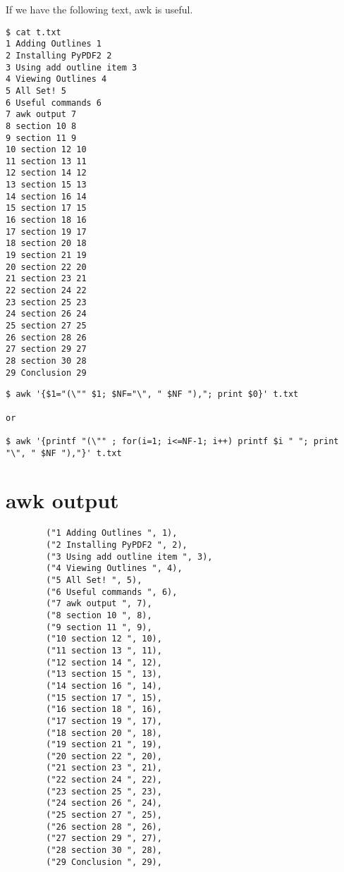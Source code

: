 \documentclass{article}
\begin{document}
If we have the following text, awk is useful.

\begin{verbatim}
$ cat t.txt
1 Adding Outlines 1
2 Installing PyPDF2 2
3 Using add outline item 3
4 Viewing Outlines 4
5 All Set! 5
6 Useful commands 6
7 awk output 7
8 section 10 8
9 section 11 9
10 section 12 10
11 section 13 11
12 section 14 12
13 section 15 13
14 section 16 14
15 section 17 15
16 section 18 16
17 section 19 17
18 section 20 18
19 section 21 19
20 section 22 20
21 section 23 21
22 section 24 22
23 section 25 23
24 section 26 24
25 section 27 25
26 section 28 26
27 section 29 27
28 section 30 28
29 Conclusion 29

\end{verbatim}


\begin{verbatim}
$ awk '{$1="(\"" $1; $NF="\", " $NF "),"; print $0}' t.txt

or 

$ awk '{printf "(\"" ; for(i=1; i<=NF-1; i++) printf $i " "; print "\", " $NF "),"}' t.txt
\end{verbatim}





\newpage

\section{awk output}

\begin{verbatim}
        ("1 Adding Outlines ", 1),
        ("2 Installing PyPDF2 ", 2),
        ("3 Using add outline item ", 3),
        ("4 Viewing Outlines ", 4),
        ("5 All Set! ", 5),
        ("6 Useful commands ", 6),
        ("7 awk output ", 7),
        ("8 section 10 ", 8),
        ("9 section 11 ", 9),
        ("10 section 12 ", 10),
        ("11 section 13 ", 11),
        ("12 section 14 ", 12),
        ("13 section 15 ", 13),
        ("14 section 16 ", 14),
        ("15 section 17 ", 15),
        ("16 section 18 ", 16),
        ("17 section 19 ", 17),
        ("18 section 20 ", 18),
        ("19 section 21 ", 19),
        ("20 section 22 ", 20),
        ("21 section 23 ", 21),
        ("22 section 24 ", 22),
        ("23 section 25 ", 23),
        ("24 section 26 ", 24),
        ("25 section 27 ", 25),
        ("26 section 28 ", 26),
        ("27 section 29 ", 27),
        ("28 section 30 ", 28),
        ("29 Conclusion ", 29),
\end{verbatim}
\end{document}
